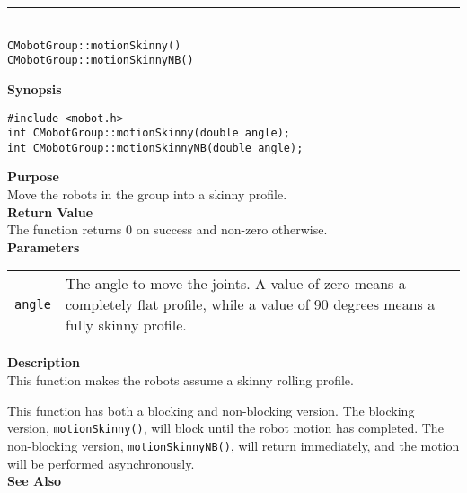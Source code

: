 \noindent
\vspace{5pt}
\rule{4.5in}{0.015in}\\
\noindent
{\LARGE \texttt{CMobotGroup::motionSkinny()}}\\
{\LARGE \texttt{CMobotGroup::motionSkinnyNB()}}\\
{}

\noindent
{\bf Synopsis}
\vspace{-8pt}
\begin{verbatim}
#include <mobot.h>
int CMobotGroup::motionSkinny(double angle);
int CMobotGroup::motionSkinnyNB(double angle);
\end{verbatim}

\noindent
{\bf Purpose}\\
Move the robots in the group into a skinny profile.\\

\noindent
{\bf Return Value}\\
The function returns 0 on success and non-zero otherwise.\\

\noindent
{\bf Parameters}\\
\vspace{-0.1in}
\begin{description}
\item               
\begin{tabular}{p{10 mm}p{145 mm}}
\texttt{angle} & The angle to move the joints. A value of zero means a
completely flat profile, while a value of 90 degrees means a fully skinny
profile.  \\
\end{tabular}
\end{description}


\noindent
{\bf Description}\\
This function makes the robots assume a skinny rolling profile.

This function has both a blocking and non-blocking version.
The blocking version, \texttt{motionSkinny()}, will block until the
robot motion has completed. The non-blocking version, \texttt{motionSkinnyNB()},
will return immediately, and the motion will be performed asynchronously.\\

\noindent
{\bf See Also}\\

